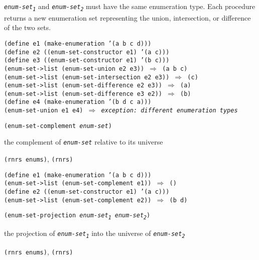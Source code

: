 \texttt{\textit{enum-set\textsubscript{1}}} and \texttt{\textit{enum-set\textsubscript{2}}} must have the same enumeration type.
Each procedure returns a new enumeration set representing the union, intersection,
or difference of the two sets.

\begin{alltt}
(define e1 (make-enumeration '(a b c d)))
(define e2 ((enum-set-constructor e1) '(a c)))
(define e3 ((enum-set-constructor e1) '(b c)))
(enum-set-\textgreater{}list (enum-set-union e2 e3)) \(\Rightarrow\) (a b c)
(enum-set-\textgreater{}list (enum-set-intersection e2 e3)) \(\Rightarrow\) (c)
(enum-set-\textgreater{}list (enum-set-difference e2 e3)) \(\Rightarrow\) (a)
(enum-set-\textgreater{}list (enum-set-difference e3 e2)) \(\Rightarrow\) (b)
(define e4 (make-enumeration '(b d c a)))
(enum-set-union e1 e4) \(\Rightarrow\) \textit{exception: different enumeration types}
\end{alltt}

\begin{description}

\label{objects_s299}\item[procedure] \texttt{(enum-set-complement \textit{enum-set})}



\item[returns] the complement of \texttt{\textit{enum-set}} relative to its universe


\item[libraries] \texttt{(rnrs enums)}, \texttt{(rnrs)}
\end{description}


\begin{alltt}
(define e1 (make-enumeration '(a b c d)))
(enum-set-\textgreater{}list (enum-set-complement e1)) \(\Rightarrow\) ()
(define e2 ((enum-set-constructor e1) '(a c)))
(enum-set-\textgreater{}list (enum-set-complement e2)) \(\Rightarrow\) (b d)
\end{alltt}

\begin{description}

\label{objects_s300}\item[procedure] \texttt{(enum-set-projection \textit{enum-set\textsubscript{1}} \textit{enum-set\textsubscript{2}})}



\item[returns] the projection of \texttt{\textit{enum-set\textsubscript{1}}} into the universe of \texttt{\textit{enum-set\textsubscript{2}}}


\item[libraries] \texttt{(rnrs enums)}, \texttt{(rnrs)}
\end{description}


